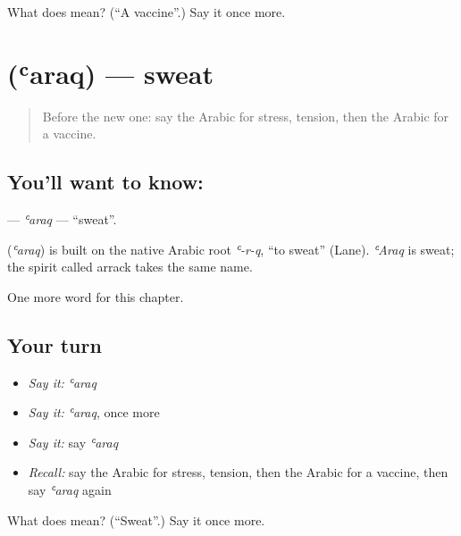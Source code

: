\begin{tcolorbox}[breakable,colback=teal!4,colframe=teal!35!black,title={Before you move on}]
What does  mean? (\textquotedblleft{}A vaccine\textquotedblright{}.) Say it once more.
\end{tcolorbox}
\section[\texorpdfstring{\ar{عرق} (ʿaraq)}{عرق (ʿaraq)}]{ (ʿaraq) — sweat}

\label{lesson:AR-C263-araq}



\begin{quote}
Before the new one: say the Arabic for stress, tension, then the Arabic for a vaccine.
\end{quote}

\subsection*{You'll want to know: }
\textbf{} — \emph{ʿaraq} — \textquotedblleft{}sweat\textquotedblright{}.

\begin{cousinweb}
\textbf{} (\emph{ʿaraq}) is built on the native Arabic root \emph{ʿ-r-q}, \textquotedblleft{}to sweat\textquotedblright{} (Lane). \emph{ʿAraq} is sweat; the spirit called arrack takes the same name.
\end{cousinweb}

\begin{grammarlens}[title={What you've built}]
One more word for this chapter.
\end{grammarlens}

\subsection*{Your turn}
\begin{itemize}
\raggedright
  \item \emph{Say it:} \emph{ʿaraq}
  \item \emph{Say it:} \emph{ʿaraq}, once more
  \item \emph{Say it:} say \emph{ʿaraq}
  \item \emph{Recall:} say the Arabic for stress, tension, then the Arabic for a vaccine, then say \emph{ʿaraq} again
\end{itemize}

\begin{tcolorbox}[breakable,colback=teal!4,colframe=teal!35!black,title={Before you move on}]
What does  mean? (\textquotedblleft{}Sweat\textquotedblright{}.) Say it once more.
\end{tcolorbox}
